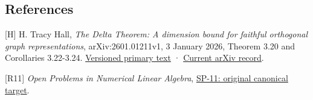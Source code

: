\documentclass[10pt,a4paper]{article}
\begin{document}
\subsection{References}\label{references}

{[}H{]} H. Tracy Hall, \emph{The Delta Theorem: A dimension bound for
faithful orthogonal graph representations}, arXiv:2601.01211v1, 3
January 2026, Theorem 3.20 and Corollaries 3.22-3.24.
\href{https://arxiv.org/html/2601.01211v1}{Versioned primary text} ·
\href{https://arxiv.org/abs/2601.01211}{Current arXiv record}.

{[}R11{]} \emph{Open Problems in Numerical Linear Algebra},
\href{https://github.com/ajt60gaibb/OpenProblemsInNLA/blob/main/eigenvalues-and-inverse-problems/SP-11/README.md}{SP-11:
original canonical target}.
\end{document}
